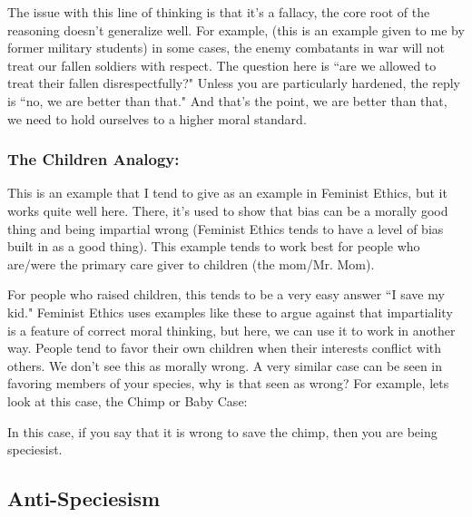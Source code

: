 The issue with this line of thinking is that it's a fallacy, the core root of the reasoning doesn't generalize well. For example, (this is an example given to me by former military students) in some cases, the enemy combatants in war will not treat our fallen soldiers with respect. The question here is ``are we allowed to treat their fallen disrespectfully?" Unless you are particularly hardened, the reply is ``no, we are better than that." And that's the point, we are better than that, we need to hold ourselves to a higher moral standard.
\subsubsection{The Children Analogy:}

This is an example that I tend to give as an example in Feminist Ethics, but it works quite well here. There, it's used to show that bias can be a morally good thing and being impartial wrong (Feminist Ethics tends to have a level of bias built in as a good thing). This example tends to work best for people who are/were the primary care giver to children (the mom/Mr. Mom).


For people who raised children, this tends to be a very easy answer ``I save my kid." Feminist Ethics uses examples like these to argue against that impartiality is a feature of correct moral thinking, but here, we can use it to work in another way. People tend to favor their own children when their interests conflict with others. We don’t see this as morally wrong. A very similar case can be seen in favoring members of your species, why is that seen as wrong? For example, lets look at this case, the Chimp or Baby Case:


In this case, if you say that it is wrong to save the chimp, then you are being speciesist. 
\subsection{Anti-Speciesism}

